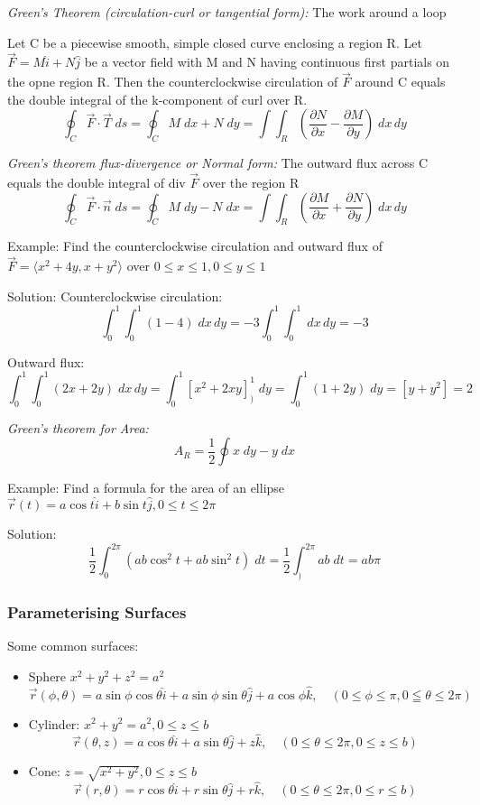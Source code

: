 \documentclass[12pt]{article}
\begin{document}
\emph{Green's Theorem (circulation-curl or tangential form):} The work around a loop

Let C be a piecewise smooth, simple closed curve enclosing a region R. Let $\vec{F} = M \hat{i} + N\hat{j}$ be a vector field with M and N having continuous first partials on the opne region R. Then the counterclockwise circulation of $\vec{F}$ around C equals the double integral of the k-component of curl over R.
\[\oint_C \vec{F} \cdot \vec{T} \; ds = \oint_C M \; dx + N \; dy = \int \int_R \left(\frac{\partial N}{\partial x} - \frac{\partial M}{\partial y}\right)\; dx\, dy\]

\emph{Green's theorem flux-divergence or Normal form:}
The outward flux across C equals the double integral of div $\vec{F}$ over the region R
\[\oint_C \vec{F} \cdot \vec{n}\; ds = \oint_C M \; dy - N \; dx = \int \int_R \left(\frac{\partial M}{\partial x} + \frac{\partial N}{\partial y} \right) \; dx\, dy\]

Example: Find the counterclockwise circulation and outward flux of $\vec{F} = \langle x^2 + 4y, x + y^2 \rangle$ over $0\leq x\leq 1, 0\leq y\leq 1$

Solution:
Counterclockwise circulation:
\[\int_0^1 \int_0^1 (1 - 4) \; dx \, dy = -3\int_0^1 \int_0^1 \; dx\, dy = -3\]

Outward flux:
\[\int_0^1 \int_0^1 (2x + 2y) \; dx\, dy = \int_0^1 \left[x^2 + 2xy\right]_)^1 \; dy = \int_0^1 (1 + 2y) \; dy = \left[y + y^2\right] = 2\]

\emph{Green's theorem for Area:}
\[A_R = \frac{1}{2} \oint x\; dy - y \; dx\]

Example: Find a formula for the area of an ellipse $\vec{r}(t) = a\cos t \hat{i} + b \sin t \hat{j}, 0\leq t\leq 2\pi$

Solution:
\[\frac{1}{2}\int_0^{2\pi} (ab \cos^2 t + ab \sin^2 t)\; dt = \frac{1}{2} \int_)^{2\pi} ab \; dt = ab\pi\]

\subsubsection{Parameterising Surfaces}
Some common surfaces:
\begin{itemize}
    \item Sphere $x^2 + y^2 + z^2 = a^2$
    \[\vec{r}(\phi, \theta) = a\sin\phi \cos \theta \hat{i} + a\sin \phi \sin \theta \hat{j}+ a\cos \phi \hat{k}, \quad (0 \leq \phi \leq \pi, 0 \leqq \theta \leq 2\pi)\]
    \item Cylinder: $x^2 + y^2 = a^2, 0 \leq z \leq b$
    \[\vec{r}(\theta, z) = a\cos \theta \hat{i} + a\sin \theta \hat{j} + z\hat{k}, \quad (0\leq \theta \leq 2\pi, 0 \leq z \leq b)\]
    \item Cone: $z=\sqrt{x^2 + y^2}, 0 \leq z \leq b$
    \[\vec{r}(r, \theta) = r\cos 
    \theta \hat{i} + r\sin \theta \hat{j} + r\hat{k}, \quad (0\leq \theta \leq 2\pi, 0 \leq r \leq b)\]
\end{itemize}
\end{document}
